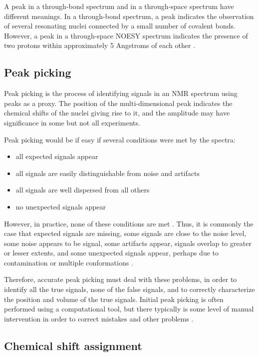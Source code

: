 A peak in a through-bond spectrum and in a through-space spectrum have 
different meanings.  In a through-bond spectrum, a peak indicates the 
observation of several resonating nuclei connected by a small number of
covalent bonds.  However, a peak in a through-space NOESY spectrum indicates
the presence of two protons within approximately 5 Angstroms of each other
\cite{neuhaus1989nuclear}.

\subsection*{Peak picking}

Peak picking is the process of identifying signals in an NMR spectrum using
peaks as a proxy.  The position of the multi-dimensional peak indicates the
chemical shifts of the nuclei giving rise to it, and the amplitude may have
significance in some but not all experiments.

Peak picking would be if easy if several conditions were met by the spectra:

\begin{itemize}
  \item all expected signals appear
  \item all signals are easily distinguishable from noise and artifacts
  \item all signals are well dispersed from all others
  \item no unexpected signals appear
\end{itemize}
 
However, in practice, none of these conditions are met \cite{williamson2009automated}.  
Thus, it is commonly
the case that expected signals are missing, some signals are close to the noise
level, some noise appears to be signal, some artifacts appear, signals overlap
to greater or lesser extents, and some unexpected signals appear, perhaps due
to contamination or multiple conformations \cite{baran2004automated}.

Therefore, accurate peak picking must deal with these problems, in order to
identify all the true signals, none of the false signals, and to correctly 
characterize the position and volume of the true signals.  Initial peak picking
is often performed using a computational tool, but there typically is some
level of manual intervention in order to correct mistakes and other problems
\cite{guerry2011automated}.

\subsection*{Chemical shift assignment}

